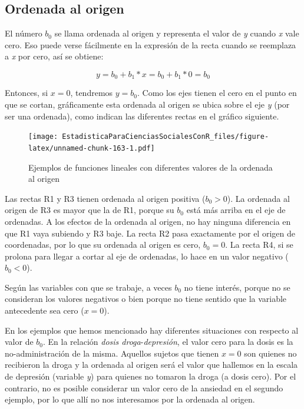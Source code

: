 \documentclass[]{book}
\begin{document}
\hypertarget{ordenada-al-origen}{%
\subsection{Ordenada al origen}\label{ordenada-al-origen}}

El número \(b_{0}\) se llama ordenada al origen y representa el valor de
\emph{y} cuando \emph{x} vale cero. Eso puede verse fácilmente en la expresión de
la recta cuando se reemplaza a \emph{x} por cero, así se obtiene:

\[y = b_{0} + b_{1}*x = b_{0} + b_{1}*0 = b_{0}\]

Entonces, si \(x = 0\), tendremos \(y = b_0\). Como los ejes
tienen el cero en el punto en que se cortan, gráficamente esta ordenada
al origen se ubica sobre el eje \emph{y} (por ser una ordenada), como indican
las diferentes rectas en el gráfico siguiente.

\begin{figure}
\centering
\texttt{[image: EstadisticaParaCienciasSocialesConR\_files/figure-latex/unnamed-chunk-163-1.pdf]}
\caption{\label{fig:unnamed-chunk-163}Ejemplos de funciones lineales con diferentes valores de la ordenada al origen}
\end{figure}

Las rectas R1 y R3 tienen ordenada al origen positiva (\(b_{0} > 0\)). La ordenada al origen de R3 es mayor que la de R1, porque su \(b_{0}\) está más arriba en el eje de ordenadas. A los efectos de la ordenada al origen, no hay ninguna diferencia en que R1 vaya subiendo y R3 baje. La recta R2 pasa exactamente por el origen de coordenadas, por lo que su ordenada al origen es cero, \(b_{0} = 0\). La recta R4, si se prolona para llegar a cortar al eje de ordenadas, lo hace en un valor negativo (\(b_{0} < 0\)).

Según las variables con que se trabaje, a veces \(b_{0}\) no tiene
interés, porque no se consideran los valores negativos o bien porque no tiene sentido que la variable antecedente sea cero (\(x=0\)).

En los ejemplos que hemos mencionado hay diferentes situaciones con
respecto al valor de \(b_{0}\). En la relación \emph{dosis droga}-\emph{depresión}, el valor cero para la dosis es la no-administración de la misma. Aquellos sujetos que tienen \(x = 0\) son quienes no recibieron la droga y
la ordenada al origen será el valor que hallemos en la escala de
depresión (variable \emph{y}) para quienes no tomaron la droga (a dosis
cero). Por el contrario, no es posible considerar un valor cero de la
ansiedad en el segundo ejemplo, por lo que allí no nos interesamos por la ordenada al origen.
\end{document}
